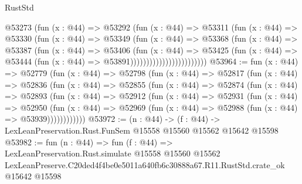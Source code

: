 \begin{lexlean}{RustStd}
\begin{coremodule}
                              @53273
                                (fun (x : @44) =>
                                @53292
                                  (fun (x : @44) =>
                                  @53311
                                    (fun (x : @44) =>
                                    @53330
                                      (fun (x : @44) =>
                                      @53349
                                        (fun (x : @44) =>
                                        @53368
                                          (fun (x : @44) =>
                                          @53387
                                            (fun (x : @44) =>
                                            @53406
                                              (fun (x : @44) =>
                                              @53425
                                                (fun (x : @44) =>
                                                @53444
                                                  (fun (x : @44) => @53891))))))))))))))))))))))))
@53964 := fun (x : @44) =>
  @52779
    (fun (x : @44) =>
    @52798
      (fun (x : @44) =>
      @52817
        (fun (x : @44) =>
        @52836
          (fun (x : @44) =>
          @52855
            (fun (x : @44) =>
            @52874
              (fun (x : @44) =>
              @52893
                (fun (x : @44) =>
                @52912
                  (fun (x : @44) =>
                  @52931
                    (fun (x : @44) =>
                    @52950
                      (fun (x : @44) =>
                      @52969 (fun (x : @44) => @52988 (fun (x : @44) => @53939))))))))))))
@53972 := (n : @44) ->
  (f : @44) -> LexLeanPreservation.Rust.FunSem @15558 @15560 @15562 @15642 @15598
@53982 := fun (n : @44) =>
  fun (f : @44) =>
  LexLeanPreservation.Rust.simulate
    @15558
    @15560
    @15562
    LexLeanPreserve.C20ded4f4be0e5011a640fb6c30888a67.R11.RustStd.crate_ok
    @15642
    @15598
\end{coremodule}
\end{lexlean}
